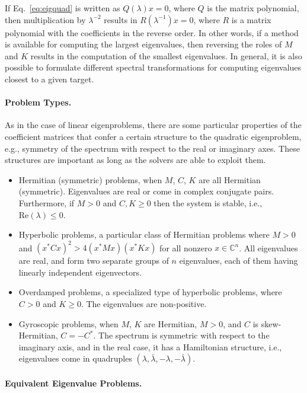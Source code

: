 If Eq.\ \ref{eq:eigquad} is written as $Q(\lambda)x=0$, where $Q$ is the matrix polynomial, then multiplication by $\lambda^{-2}$ results in $R(\lambda^{-1})x=0$, where $R$ is a matrix polynomial with the coefficients in the reverse order. In other words, if a method is available for computing the largest eigenvalues, then reversing the roles of $M$ and $K$ results in the computation of the smallest eigenvalues. In general, it is also possible to formulate different spectral transformations for computing eigenvalues closest to a given target.

\paragraph{Problem Types.}

As in the case of linear eigenproblems, there are some particular properties of the coefficient matrices that confer a certain structure to the quadratic eigenproblem, e.g., symmetry of the spectrum with respect to the real or imaginary axes. These structures are important as long as the solvers are able to exploit them.

\begin{itemize}
\item Hermitian (symmetric) problems, when $M$, $C$, $K$ are all Hermitian (symmetric). Eigenvalues are real or come in complex conjugate pairs. Furthermore, if $M>0$ and $C,K\geq 0$ then the system is stable, i.e., $\text{Re}(\lambda)\leq 0$.
\item Hyperbolic problems, a particular class of Hermitian problems where $M>0$ and $(x^*Cx)^2>4(x^*Mx)(x^*Kx)$ for all nonzero $x\in\mathbb{C}^n$. All eigenvalues are real, and form two separate groups of $n$ eigenvalues, each of them having linearly independent eigenvectors.
\item Overdamped problems, a specialized type of hyperbolic problems, where $C>0$ and $K\geq 0$. The eigenvalues are non-positive.
\item Gyroscopic problems, when $M$, $K$ are Hermitian, $M>0$, and $C$ is skew-Hermitian, $C=-C^*$. The spectrum is symmetric with respect to the imaginary axis, and in the real case, it has a Hamiltonian structure, i.e., eigenvalues come in quadruples $(\lambda,\bar{\lambda},-\lambda,-\bar{\lambda})$.
\end{itemize}

\paragraph{Equivalent Eigenvalue Problems.}

